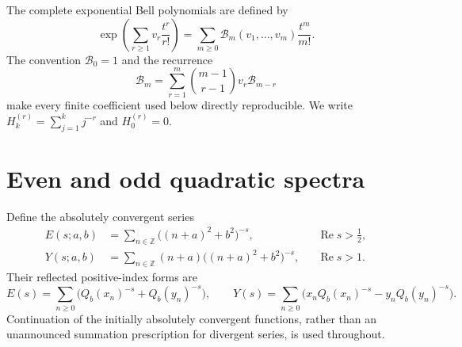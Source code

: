 \documentclass[11pt,letterpaper]{article}
\numberwithin{equation}{section}
\theoremstyle{definition}
\newcommand{\Rea}{\operatorname{Re}}
\newcommand{\Z}{\mathbb Z}
\newcommand{\Bcal}{\mathcal B}
\begin{document}
The complete exponential Bell polynomials are defined by
\begin{equation}\label{qspec:eq:bell}
\exp\left(\sum_{r\ge1}v_r\frac{t^r}{r!}\right)
=\sum_{m\ge0}\Bcal_m(v_1,\ldots,v_m)\frac{t^m}{m!}.
\end{equation}
The convention $\Bcal_0=1$ and the recurrence
\begin{equation}\label{qspec:eq:bell-recurrence}
\Bcal_m=\sum_{r=1}^m\binom{m-1}{r-1}v_r\Bcal_{m-r}
\end{equation}
make every finite coefficient used below directly reproducible. We write
$H_k^{(r)}=\sum_{j=1}^k j^{-r}$ and $H_0^{(r)}=0$.


\section{Even and odd quadratic spectra}\label{qspec:sec:transform}

Define the absolutely convergent series
\begin{align}
E(s;a,b)&=\sum_{n\in\Z}\bigl((n+a)^2+b^2\bigr)^{-s},
&&\Rea s>\tfrac12,\label{qspec:eq:E}\\
Y(s;a,b)&=\sum_{n\in\Z}(n+a)\bigl((n+a)^2+b^2\bigr)^{-s},
&&\Rea s>1.\label{qspec:eq:Y}
\end{align}
Their reflected positive-index forms are
\[
E(s)=\sum_{n\ge0}\bigl(Q_b(x_n)^{-s}+Q_b(y_n)^{-s}\bigr),
\qquad
Y(s)=\sum_{n\ge0}\bigl(x_nQ_b(x_n)^{-s}-y_nQ_b(y_n)^{-s}\bigr).
\]
Continuation of the initially absolutely convergent functions, rather than
an unannounced summation prescription for divergent series, is used throughout.
\end{document}
